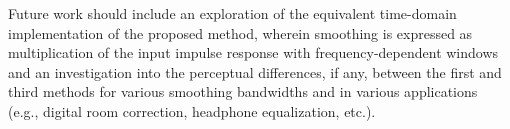 Future work should include an exploration of the equivalent time-domain implementation of the proposed method, wherein smoothing is expressed as multiplication of the input impulse response with frequency-dependent windows \citep{HatziantoniouMourjopoulos2000} and an investigation into the perceptual differences, if any, between the first and third methods for various smoothing bandwidths and in various applications (e.g., digital room correction, headphone equalization, etc.).